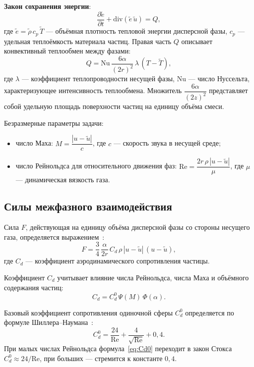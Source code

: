 \documentclass[14pt,a4paper]{extarticle}
\numberwithin{figure}{section}
\numberwithin{table}{section}
\begin{document}
\textbf{Закон сохранения энергии}:
\begin{equation}
    \frac{\partial \tilde{e}}{\partial t} + \mathrm{div}(\tilde{e}\,\tilde{u})
    = Q,
    \label{eq:energy}
\end{equation}
где $\tilde{e} = \tilde{\rho}\,c_p\,\tilde{T}$ --- объёмная плотность тепловой энергии дисперсной фазы,
$c_p$ --- удельная теплоёмкость материала частиц.
Правая часть $Q$ описывает конвективный теплообмен между фазами:
\begin{equation}
    Q = \mathrm{Nu}\,\frac{6\alpha}{(2r)^2}\,\lambda\,(T - \tilde{T}),
    \label{eq:heat}
\end{equation}
где $\lambda$ --- коэффициент теплопроводности несущей фазы,
$\mathrm{Nu}$ --- число Нуссельта, характеризующее интенсивность теплообмена.
Множитель $\dfrac{6\alpha}{(2z)^2}$ представляет собой удельную площадь поверхности
частиц на единицу объёма смеси.

Безразмерные параметры задачи:
\begin{itemize}
    \item число Маха: $M = \dfrac{|u - \tilde{u}|}{c}$, где $c$ --- скорость звука в несущей среде;
    \item число Рейнольдса для относительного движения фаз:
          $\mathrm{Re} = \dfrac{2r\,\rho\,|u - \tilde{u}|}{\mu}$,
          где $\mu$ --- динамическая вязкость газа.
\end{itemize}

\subsection{Силы межфазного взаимодействия}

Сила $F$, действующая на единицу объёма дисперсной фазы со стороны несущего газа,
определяется выражением~\cite{Nigmatulin1987}:
\begin{equation}
    F = \frac{3}{4}\,\frac{\alpha}{2r}\,C_d\,\rho\,|u - \tilde{u}|\,(u - \tilde{u}),
    \label{eq:force}
\end{equation}
где $C_d$ --- коэффициент аэродинамического сопротивления частицы.

Коэффициент $C_d$ учитывает влияние числа Рейнольдса, числа Маха и объёмного
содержания частиц:
\begin{equation}
    C_d = C_d^0\,\Psi(M)\,\Phi(\alpha).
    \label{eq:Cd}
\end{equation}

Базовый коэффициент сопротивления одиночной сферы $C_d^0$ определяется
по формуле Шиллера--Наумана~\cite{SchillerNaumann1935}:
\begin{equation}
    C_d^0 = \frac{24}{\mathrm{Re}} + \frac{4}{\sqrt{\mathrm{Re}}} + 0{,}4.
    \label{eq:Cd0}
\end{equation}
При малых числах Рейнольдса формула~\eqref{eq:Cd0} переходит в закон Стокса
$C_d^0 \approx 24/\mathrm{Re}$, при больших --- стремится к константе $0{,}4$.
\end{document}
